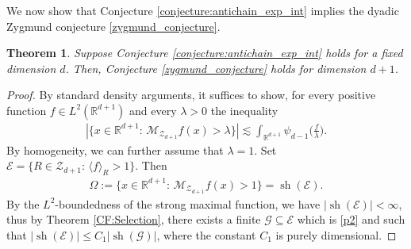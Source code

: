 \documentclass[oneside]{amsart}
\newtheorem{theorem}{Theorem}
\theoremstyle{definition}
\theoremstyle{plain}
\numberwithin{equation}{section}
\numberwithin{theorem}{section}
\newcommand{\sh}{\operatorname{sh}}
\begin{document}
We now show that Conjecture \ref{conjecture:antichain_exp_int} implies the
dyadic Zygmund conjecture \ref{zygmund_conjecture}.
\begin{theorem}
  Suppose Conjecture \ref{conjecture:antichain_exp_int} holds for a fixed
  dimension $d$. Then, Conjecture \ref{zygmund_conjecture} holds for dimension
  $d+1$.
\end{theorem}
\begin{proof}
  By standard density arguments, it suffices to show, for
  every positive function $f \in L^2(\mathbb{R}^{d+1})$ and every $\lambda > 0$
  the inequality
  \begin{align*}
    |\{x \in \mathbb{R}^{d+1}:\,
      \mathcal{M}_{\mathcal{Z}_{d+1}}f(x) > \lambda\}| \lesssim
      \int_{\mathbb{R}^{d+1}} \psi_{d-1}\bigg(\frac{f}{\lambda}\bigg).
  \end{align*}
  By homogeneity, we can further assume that $\lambda = 1$.
  Set
  $\mathcal{E} = \{R \in \mathcal{Z}_{d+1}:\, \langle f \rangle_R > 1\}$.
  Then
  \begin{align*}
  \Omega := \{x \in \mathbb{R}^{d+1}:\,
    \mathcal{M}_{\mathcal{Z}_{d+1}}f(x) > 1\} = \sh(\mathcal{E}).
  \end{align*}
  By the $L^2$-boundedness of the strong maximal function, we have
  $|\sh(\mathcal{E})| < \infty$, thus by Theorem \ref{CF:Selection}, there
  exists a finite $\mathcal{G} \subseteq \mathcal{E}$ which is \eqref{p2} and
  such that $|\sh(\mathcal{E})| \leq C_1|\sh(\mathcal{G})|$, where the constant
  $C_1$ is purely dimensional.


\end{proof}
\end{document}
